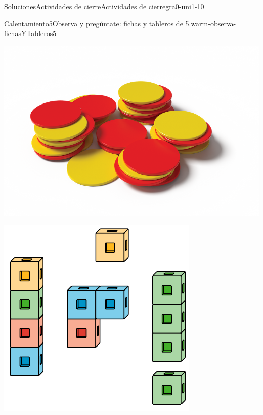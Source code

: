 \documentclass[twoside,10pt,]{article}
\begin{document}
\begin{solutions-section}{Soluciones}{Actividades de cierre}{}{Actividades de cierre}{}{}{gra0-uni1-10}
\begin{explorationsolution}{Calentamiento}{5}{Observa y pregúntate: fichas y tableros de 5.}{warm-observa-fichasYTableros5}
\begin{sidebyside}{2}{0.05}{0.05}{0.1}
\begin{sbspanel}{0.4}
\end{sbspanel}%
\begin{sbspanel}{0.4}%
\includegraphics[width=\linewidth]{external/png-source/K.1.A Beta Student Workbook.RedYellowChips_withShadow.png}
\end{sbspanel}%
\end{sidebyside}%
\begin{sidebyside}{2}{0.05}{0.05}{0.1}%
\begin{sbspanel}{0.4}%
\includegraphics[width=\linewidth]{external/svg-source/tikz-file-128850.pdf}

\end{sbspanel}
\end{sidebyside}
\end{explorationsolution}
\end{solutions-section}
\end{document}
